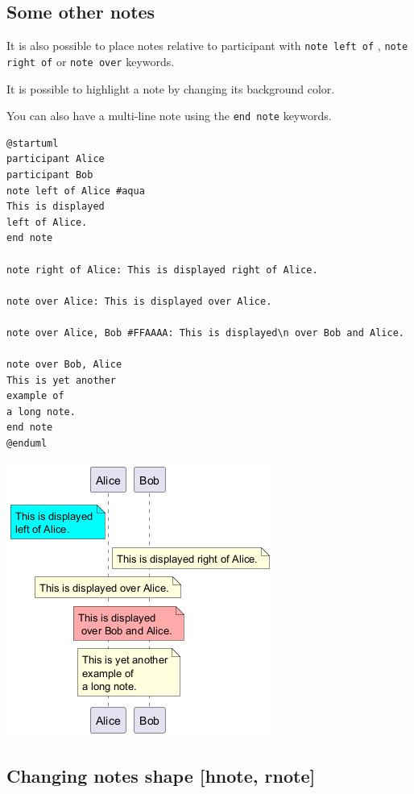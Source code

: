 %
%
\subsection{Some other notes}




It is also possible to place notes relative to participant with \texttt{note left of} , \texttt{note right of} or \texttt{note over} keywords.


It is possible to highlight a note by changing its background color.


You can also have a multi-line note using the \texttt{end note} keywords.


\begin{verbatim}
@startuml
participant Alice
participant Bob
note left of Alice #aqua
This is displayed
left of Alice.
end note

note right of Alice: This is displayed right of Alice.

note over Alice: This is displayed over Alice.

note over Alice, Bob #FFAAAA: This is displayed\n over Bob and Alice.

note over Bob, Alice
This is yet another
example of
a long note.
end note
@enduml
\end{verbatim}
\begin{center}
\includegraphics[scale=0.60]{imgw/img-8d28b8bce9277dedab7ab65127d40e69.png}
\end{center}
%
%
\subsection{Changing notes shape [hnote, rnote]}



